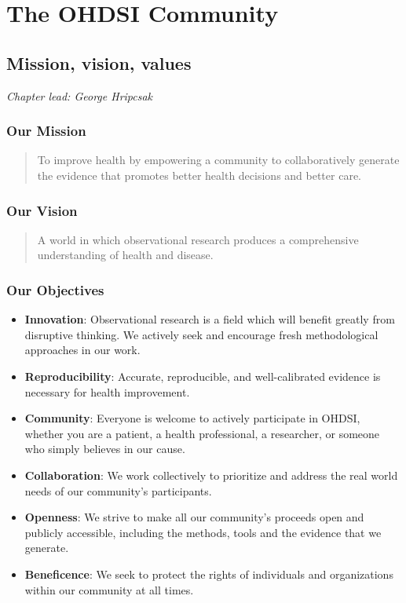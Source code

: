\documentclass[11pt]{book}
\theoremstyle{definition}
\theoremstyle{definition}
\theoremstyle{definition}
\theoremstyle{remark}
\begin{document}
\hypertarget{part-the-ohdsi-community}{%
\part{The OHDSI Community}\label{part-the-ohdsi-community}}

\hypertarget{MissionVissionValues}{%
\chapter{Mission, vision, values}\label{MissionVissionValues}}

\emph{Chapter lead: George Hripcsak}

\hypertarget{our-mission}{%
\section{Our Mission}\label{our-mission}}

\begin{quote}
To improve health by empowering a community to collaboratively generate the evidence that promotes better health decisions and better care.
\end{quote}

\hypertarget{our-vision}{%
\section{Our Vision}\label{our-vision}}

\begin{quote}
A world in which observational research produces a comprehensive understanding of health and disease.
\end{quote}

\hypertarget{our-objectives}{%
\section{Our Objectives}\label{our-objectives}}

\begin{itemize}
\item
  \textbf{Innovation}: Observational research is a field which will benefit greatly from disruptive thinking. We actively seek and encourage fresh methodological approaches in our work.
\item
  \textbf{Reproducibility}: Accurate, reproducible, and well-calibrated evidence is necessary for health improvement.
\item
  \textbf{Community}: Everyone is welcome to actively participate in OHDSI, whether you are a patient, a health professional, a researcher, or someone who simply believes in our cause.
\item
  \textbf{Collaboration}: We work collectively to prioritize and address the real world needs of our community's participants.
\item
  \textbf{Openness}: We strive to make all our community's proceeds open and publicly accessible, including the methods, tools and the evidence that we generate.
\item
  \textbf{Beneficence}: We seek to protect the rights of individuals and organizations within our community at all times.
\end{itemize}
\end{document}
